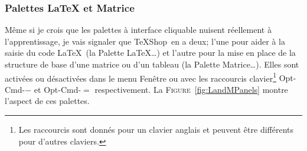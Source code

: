 \documentclass[11pt,french]{article}
\newcommand{\TS}{\textsf{\TeX Shop}}
\newcommand{\cmd}[1]{\textsf{#1}}
\newcommand{\mnu}[1]{\textsf{#1}}
\begin{document}
\subsubsection{Palettes LaTeX et Matrice}

Même si je crois que les palettes à interface cliquable nuisent réellement à l'apprentissage, je vais signaler que \TS\ en a deux; l'une pour aider à la saisie du code \LaTeX\ (la \mnu{Palette LaTeX…}) et l'autre pour la mise en place de la structure de base d'une matrice ou d'un tableau (la \mnu{Palette Matrice…}). Elles sont activées ou désactivées dans le menu \mnu{Fenêtre} ou avec les raccourcis clavier\footnote{Les raccourcis sont donnés pour un clavier anglais et peuvent être différents pour d'autres claviers.} \cmd{Opt-Cmd-{}$-$} et \cmd{Opt-Cmd-$=$} respectivement. La \textsc{Figure}~\vref{fig:LandMPanels} montre l'aspect de ces palettes.
\end{document}
